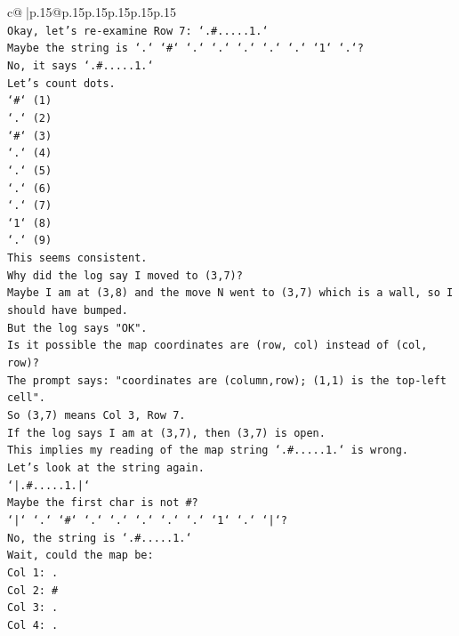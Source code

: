 \documentclass{article}
\begin{document}
{\begin{supertabular}{c@{$\;$}|p{.15\linewidth}@{}p{.15\linewidth}p{.15\linewidth}p{.15\linewidth}p{.15\linewidth}p{.15\linewidth}}
{{{\\ 
\texttt{Okay, let's re{-}examine Row 7: `.\#.....1.`} \\
\texttt{Maybe the string is `.` `\#` `.` `.` `.` `.` `.` `1` `.`?} \\
\texttt{No, it says `.\#.....1.`} \\
\texttt{Let's count dots.} \\
\texttt{`\#` (1)} \\
\texttt{`.` (2)} \\
\texttt{`\#` (3)} \\
\texttt{`.` (4)} \\
\texttt{`.` (5)} \\
\texttt{`.` (6)} \\
\texttt{`.` (7)} \\
\texttt{`1` (8)} \\
\texttt{`.` (9)} \\
\texttt{This seems consistent.} \\
\texttt{Why did the log say I moved to (3,7)?} \\
\texttt{Maybe I am at (3,8) and the move N went to (3,7) which is a wall, so I should have bumped.} \\
\texttt{But the log says "OK".} \\
\texttt{Is it possible the map coordinates are (row, col) instead of (col, row)?} \\
\texttt{The prompt says: "coordinates are (column,row); (1,1) is the top{-}left cell".} \\
\texttt{So (3,7) means Col 3, Row 7.} \\
\texttt{If the log says I am at (3,7), then (3,7) is open.} \\
\texttt{This implies my reading of the map string `.\#.....1.` is wrong.} \\
\texttt{Let's look at the string again.} \\
\texttt{`|.\#.....1.|`} \\
\texttt{Maybe the first char is not \#?} \\
\texttt{`|` `.` `\#` `.` `.` `.` `.` `.` `1` `.` `|`?} \\
\texttt{No, the string is `.\#.....1.`} \\
\texttt{Wait, could the map be:} \\
\texttt{Col 1: .} \\
\texttt{Col 2: \#} \\
\texttt{Col 3: .} \\
\texttt{Col 4: .} \\
}}}
\end{supertabular}}
\end{document}
